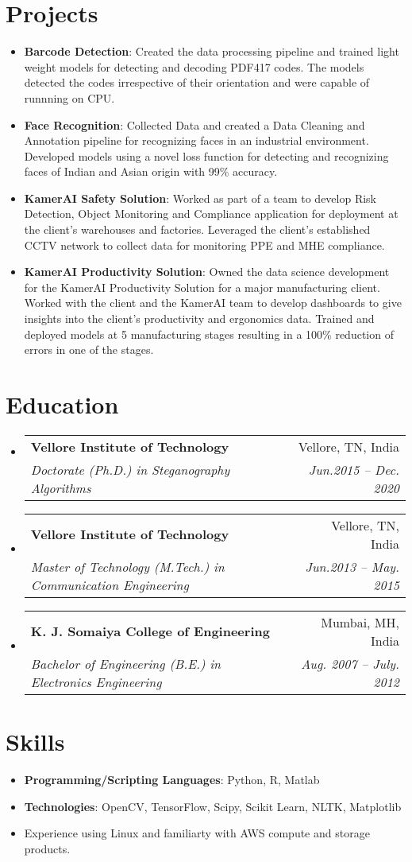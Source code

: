 \documentclass[a4paper,11pt]{article}
\makeatletter
\newcommand{\resumeItem}[2]{
  \item\small{
    \textbf{#1}{: #2 \vspace{-2pt}}
  }
}
\newcommand{\resumeSubheading}[4]{
  \vspace{-1pt}\item
    \begin{tabular*}{0.97\textwidth}[t]{l@{\extracolsep{\fill}}r}
      \textbf{#1} & #2 \\
      \textit{\small#3} & \textit{\small #4} \\
    \end{tabular*}\vspace{-5pt}
}
\newcommand{\resumeSubItem}[2]{\resumeItem{#1}{#2}\vspace{-4pt}}
\newcommand{\resumeSubHeadingListStart}{\begin{itemize}[leftmargin=*]}
\newcommand{\resumeSubHeadingListEnd}{\end{itemize}}
\newcommand{\resumeItemListStart}{\begin{itemize}}
\newcommand{\resumeItemListEnd}{\end{itemize}\vspace{-5pt}}
\makeatother
\begin{document}
\section{Projects}
  \resumeItemListStart
    \resumeSubItem{Barcode Detection}
      {Created the data processing pipeline and trained light weight models for detecting and decoding PDF417 codes. The models detected the codes irrespective of their orientation and were capable of runnning on CPU.}
      
    \resumeSubItem{Face Recognition}
      {Collected Data and created a Data Cleaning and Annotation pipeline for recognizing faces in an industrial environment. Developed models using a novel loss function for detecting and recognizing faces of Indian and Asian origin with 99\% accuracy.}

    \resumeSubItem{KamerAI Safety Solution}
      {Worked as part of a team to develop Risk Detection, Object Monitoring and Compliance application for deployment at the client's warehouses and factories. Leveraged the client's established CCTV network to collect data for monitoring PPE and MHE compliance.}
    
    \resumeSubItem{KamerAI Productivity Solution}
      {Owned the data science development for the KamerAI Productivity Solution for a major manufacturing client. Worked with the client and the KamerAI team to develop dashboards to give insights into the client's productivity and ergonomics data. Trained and deployed models at 5 manufacturing stages resulting in a 100\% reduction of errors in one of the stages.}
  \resumeItemListEnd

\section{Education}
  \resumeSubHeadingListStart
    \resumeSubheading
      {Vellore Institute of Technology}{Vellore, TN, India}
      {Doctorate (Ph.D.) in Steganography Algorithms}{Jun.2015 -- Dec. 2020}
    \resumeSubheading
      {Vellore Institute of Technology}{Vellore, TN, India}
      {Master of Technology (M.Tech.) in Communication Engineering}{Jun.2013 -- May. 2015}
    \resumeSubheading
      {K. J. Somaiya College of Engineering}{Mumbai, MH, India}
      {Bachelor of Engineering (B.E.) in Electronics Engineering}{Aug. 2007 -- July. 2012}
  \resumeSubHeadingListEnd

\section{Skills}
	\begin{itemize}[leftmargin=*, itemsep = -4pt]
		\item{\textbf{Programming/Scripting Languages}{: Python, R, Matlab}}
		\item{\textbf{Technologies}{: OpenCV, TensorFlow, Scipy, Scikit Learn, NLTK, Matplotlib}}
		\item {Experience using Linux and familiarty with AWS compute and storage products.}
	\end{itemize}
\end{document}
